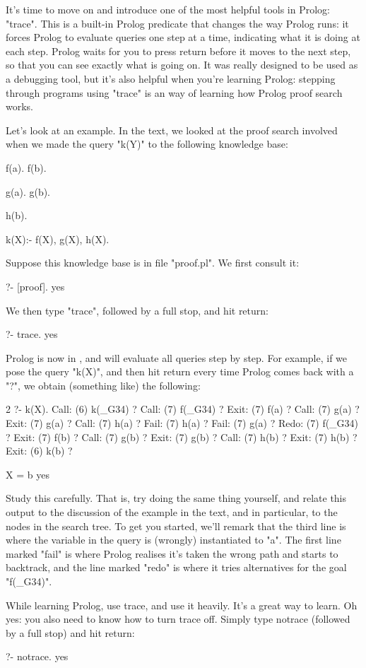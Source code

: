 It's time to move on and introduce one of the most helpful tools in
Prolog: "trace". This is a built-in
Prolog predicate that changes the
way Prolog runs: it forces Prolog to evaluate queries one step at a
time, indicating what it is doing at each step. Prolog waits for you
to press return before it moves to the next step, so that you can see
exactly what is going on. It was really designed to be used as a
debugging tool, but it's also helpful when you're learning
Prolog: stepping through programs using "trace" is an
 way of learning how Prolog proof search works.

Let's look at an example.  In the text, we looked at the proof
search involved when we made the query "k(Y)" to the following
knowledge base:
\begin{LPNcodedisplay}
f(a).
f(b).

g(a).
g(b).

h(b).

k(X):- f(X), g(X), h(X).
\end{LPNcodedisplay}

Suppose this knowledge base is in file "proof.pl". We first consult
it:
\begin{LPNcodedisplay}
?- [proof].
yes
\end{LPNcodedisplay}
%
We then type "trace", followed by a full stop,  and hit return:
\begin{LPNcodedisplay}
?- trace.
yes
\end{LPNcodedisplay}
%
Prolog is now in , and will evaluate all queries step by
step.  For example, if we pose the query "k(X)", and then hit return
every time Prolog comes back with a "?", we obtain (something like)
the following:
\begin{LPNcodedisplay}
[trace] 2 ?- k(X).
   Call: (6) k(_G34) ?
   Call: (7) f(_G34) ?
   Exit: (7) f(a) ?
   Call: (7) g(a) ?
   Exit: (7) g(a) ?
   Call: (7) h(a) ?
   Fail: (7) h(a) ?
   Fail: (7) g(a) ?
   Redo: (7) f(_G34) ?
   Exit: (7) f(b) ?
   Call: (7) g(b) ?
   Exit: (7) g(b) ?
   Call: (7) h(b) ?
   Exit: (7) h(b) ?
   Exit: (6) k(b) ?

X = b
yes
\end{LPNcodedisplay}

Study this carefully. That is, try doing the same thing yourself, and
relate this output to the discussion of the example in the text, and
in particular, to the nodes in the search tree.  To get you started,
we'll remark that the third line is where the variable in the query is
(wrongly) instantiated to "a". The first line marked "fail" is where
Prolog realises it's taken the wrong path and starts to backtrack, and
the line marked "redo" is where it tries alternatives for the goal
"f(_G34)".

\clearpage
While learning Prolog, use trace, and use it heavily. It's a great way
to learn.
Oh yes: you also need to know how to turn trace off. Simply type
notrace (followed by a full
stop) and hit return:
\begin{LPNcodedisplay}
?- notrace.
yes
\end{LPNcodedisplay}
